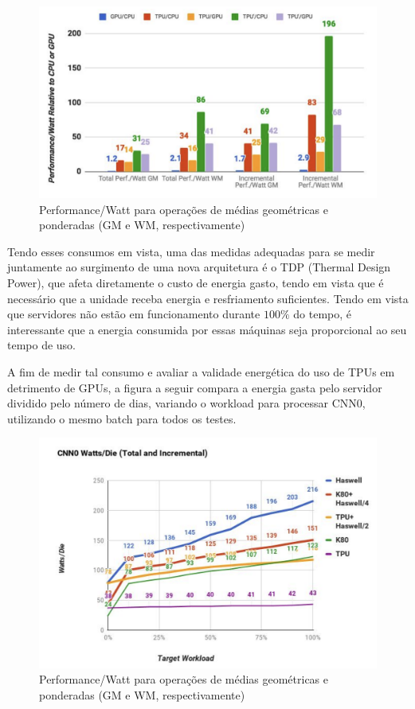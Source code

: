 \documentclass{report}
\begin{document}
\begin{figure}[h]
	\includegraphics[scale=0.5]{performance-watt}
	\centering
	\caption{Performance/Watt para operações de médias geométricas e ponderadas (GM e WM, respectivamente)}
\end{figure}

Tendo esses consumos em vista, uma das medidas adequadas para se medir juntamente ao surgimento de uma nova arquitetura é o TDP (Thermal Design Power), que afeta diretamente o custo de energia gasto, tendo em vista que é necessário que a unidade receba energia e resfriamento suficientes. Tendo em vista que servidores não estão em funcionamento durante $100\%$ do tempo, é interessante que a energia consumida por essas máquinas seja proporcional ao seu tempo de uso.

A fim de medir tal consumo e avaliar a validade energética do uso de TPUs em detrimento de GPUs, a figura a seguir compara a energia gasta pelo servidor dividido pelo número de dias, variando o workload para processar CNN0, utilizando o mesmo batch para todos os testes.

\begin{figure}[h]
	\includegraphics[scale=0.5]{watts-die}
	\centering
	\caption{Performance/Watt para operações de médias geométricas e ponderadas (GM e WM, respectivamente)}
\end{figure}
\end{document}
